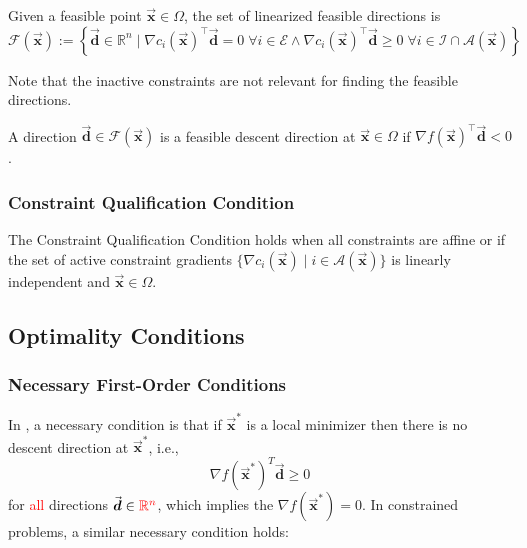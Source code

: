 \documentclass[9pt, headings=standardclasses, parskip=half]{scrartcl}
\renewcommand{\emph}[1]{\textcolor{mypurple}{#1}}
\newcommand{\vect}[1]{\vec{\boldsymbol{#1}}}
\newcommand{\R}{\mathbb{R}}
\begin{document}
\begin{definition}\label{def:linearized_feasible_directions}
  Given a feasible point \(\vect{x}\in\Omega\), the \emph{set of linearized feasible directions} is
  \begin{equation}\label{eq:linearized_feasible_directions}
    \mathcal{F}(\vect{x}) := \left\{ \vect{d}\in\R^{n} \mid \nabla c_{i}(\vect{x})^{\top}\vect{d}=0 \; \forall i\in\mathcal{E} \land \nabla c_{i}(\vect{x})^{\top}\vect{d}\ge 0 \; \forall i\in\mathcal{I}\cap\mathcal{A}(\vect{x}) \right\}
  \end{equation}
\end{definition}
Note that the inactive constraints are not relevant for finding the feasible directions.

\begin{definition}\label{def:feasible_descent_direction}
  A direction \(\vect{d}\in\mathcal{F}(\vect{x})\) is a feasible descent direction at \(\vect{x} \in \Omega\) if \(\nabla f(\vect{x})^{\top}\vect{d} < 0\).
\end{definition}

\subsubsection{Constraint Qualification Condition}

\begin{definition}\label{def:constraint_qualification_condition}
The Constraint Qualification Condition holds when all constraints are affine or if the set of active constraint gradients \(\{ \nabla c_{i}(\vect{x}) \mid i\in\mathcal{A}(\vect{x}) \}\) is linearly independent and \(\vect{x} \in \Omega\).
\end{definition}


\subsection{Optimality Conditions} 

\subsubsection{Necessary First-Order Conditions}
In , a necessary condition is that if $\vect{x}^*$ is a local minimizer then there is no descent direction at $\vect{x}^*$, i.e.,
\[
\nabla f\left(\vect{x}^*\right)^T \vect{d} \geq 0
\]
for \textcolor{red}{all} directions \(\vect{d} \in \textcolor{red}{\mathbb{R}^n}\), which implies the  $\nabla f\left(\vect{x}^*\right)=0$.
In constrained problems, a similar necessary condition holds:
\end{document}
